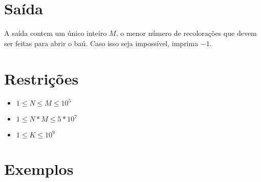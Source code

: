 \section*{Saída}

A saída contem um único inteiro $M$, o menor número de recolorações que devem ser feitas para abrir o baú.
Caso isso seja impossível, imprima $-1$.

\section*{Restrições}

\begin{itemize}
\item $1 \leq N \leq M \leq 10^5$
\item $1 \leq N*M \leq 5 * 10^7$
\item $1 \leq K \leq 10^9$
\end{itemize}


\section*{Exemplos}

\exemplo
